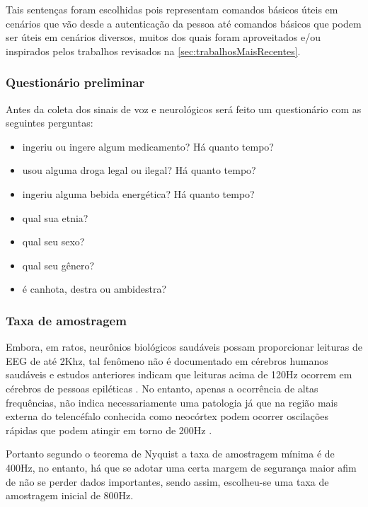 			    \par Tais sentenças foram escolhidas pois representam comandos básicos úteis em cenários que vão desde a autenticação da pessoa até comandos básicos que podem ser úteis em cenários diversos, muitos dos quais foram aproveitados e/ou inspirados pelos trabalhos revisados na \autoref{sec:trabalhosMaisRecentes}.
		    
		    \subsubsection{Questionário preliminar}
		    
			    \par Antes da coleta dos sinais de voz e neurológicos será feito um questionário com as seguintes perguntas:
			    
			    \begin{itemize}
			    	\item ingeriu ou ingere algum medicamento? Há quanto tempo?
			    	\item usou alguma droga legal ou ilegal? Há quanto tempo?
			    	\item ingeriu alguma bebida energética? Há quanto tempo?
			    	\item qual sua etnia?
			    	\item qual seu sexo?
			    	\item qual seu gênero?
			    	\item é canhota, destra ou ambidestra?
			    \end{itemize}
			    
			\subsubsection{Taxa de amostragem}
			
				\par Embora, em ratos, neurônios biológicos saudáveis possam proporcionar leituras de EEG de até 2Khz, tal fenômeno não é documentado em cérebros humanos saudáveis e estudos anteriores indicam que leituras acima de 120Hz ocorrem em cérebros de pessoas epiléticas \cite{Moffett2017}. No entanto, apenas a ocorrência de altas frequências, não indica necessariamente uma patologia já que na região mais externa do telencéfalo conhecida como neocórtex podem ocorrer oscilações rápidas que podem atingir em torno de 200Hz \cite{hfreOscEngel}.
				
				\par Portanto segundo o teorema de Nyquist a taxa de amostragem mínima é de 400Hz, no entanto, há que se adotar uma certa margem de segurança maior afim de não se perder dados importantes, sendo assim, escolheu-se uma taxa de amostragem inicial de 800Hz.
				
